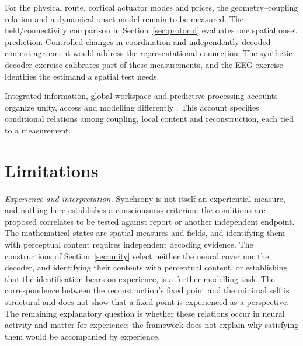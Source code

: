 \documentclass[12pt]{article}
\renewcommand{\cite}[1]{\citep{#1}}
\begin{document}
For the physical route, cortical actuator modes and prices, the
geometry--coupling relation and a dynamical onset model remain to be measured.
The field/connectivity comparison in Section~\ref{sec:protocol} evaluates one
spatial onset prediction. Controlled changes in coordination and independently
decoded content agreement would address the representational connection.
The synthetic decoder exercise calibrates part of these measurements, and the
EEG exercise identifies the estimand a spatial test needs.

Integrated-information, global-workspace and predictive-processing accounts
organize unity, access and modelling differently
\cite{tononi2016,baars1997,dehaene2014,friston2010}. This account specifies
conditional relations among coupling, local content and reconstruction, each
tied to a measurement.

\section{Limitations}
\label{sec:limitations}

\emph{Experience and interpretation.} Synchrony is not itself an experiential
measure, and nothing here establishes a consciousness criterion: the
conditions are proposed correlates to be tested against report or another
independent endpoint. The mathematical states are spatial measures and fields,
and identifying them with perceptual content requires independent decoding
evidence. The constructions of Section~\ref{sec:unity} select neither the
neural cover nor the decoder, and identifying their contents with perceptual
content, or establishing that the identification bears on experience, is a
further modelling task. The correspondence between the reconstruction's fixed
point and the minimal self is structural and does not show that a fixed point
is experienced as a perspective. The remaining explanatory question is whether
these relations occur in neural activity and matter for experience; the
framework does not explain why satisfying them would be accompanied by
experience.
\end{document}
